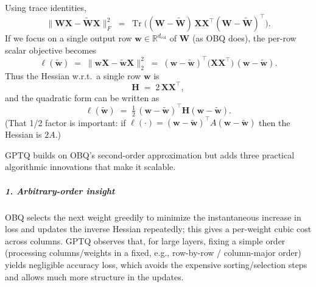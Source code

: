 \documentclass[11pt,a4paper]{article}
\theoremstyle{definition}
\begin{document}
Using trace identities,
\begin{equation}
    \| \bm{W}\bm{X} - \tilde{\bm{W}}\bm{X} \|_{F}^{2}
    \;=\;
    \operatorname{Tr}\!\big( (\bm{W}-\tilde{\bm{W}})\,\bm{X}\bm{X}^\top(\bm{W}-\tilde{\bm{W}})^\top \big).
    \label{eq:trace-form}
\end{equation}
If we focus on a single output row $\bm{w}\in\mathbb{R}^{d_{\text{col}}}$ of $\bm{W}$ (as OBQ does), the per-row scalar objective becomes
\[
    \ell(\tilde{\bm{w}})
    \;=\;
    \| \bm{w}\bm{X} - \tilde{\bm{w}}\bm{X} \|_{2}^{2}
    \;=\;
    (\bm{w}-\tilde{\bm{w}})^\top \!\big(\bm{X}\bm{X}^\top\big)\,(\bm{w}-\tilde{\bm{w}}).
\]
Thus the Hessian w.r.t.\ a single row $\bm{w}$ is
\begin{equation}
    \bm{H} \;=\; 2\,\bm{X}\bm{X}^\top,
    \label{eq:hessian}
\end{equation}
and the quadratic form can be written as
\begin{equation}
    \ell(\tilde{\bm{w}}) \;=\; \tfrac{1}{2}\,(\bm{w}-\tilde{\bm{w}})^\top \bm{H} (\bm{w}-\tilde{\bm{w}}).
    \label{eq:half-hessian}
\end{equation}
(That 1/2 factor is important: if $\ell(\cdot)=(\bm{w}-\tilde{\bm{w}})^\top\!A(\bm{w}-\tilde{\bm{w}})$ then the Hessian is $2A$.)

GPTQ builds on OBQ’s second-order approximation but adds three practical algorithmic innovations that make it scalable.

\subparagraph{1. Arbitrary-order insight}
OBQ selects the next weight greedily to minimize the instantaneous increase in loss and updates the inverse Hessian repeatedly; this gives a per-weight cubic cost across columns. GPTQ observes that, for large layers, fixing a simple order (processing columns/weights in a fixed, e.g., row-by-row / column-major order) yields negligible accuracy loss, which avoids the expensive sorting/selection steps and allows much more structure in the updates.
\end{document}
